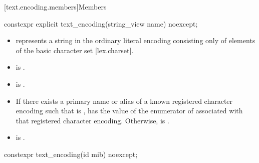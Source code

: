 \documentclass{wg21}
\begin{document}
\begin{addedblock}



[text.encoding.members]{Members}

\begin{itemdecl}
constexpr explicit text_encoding(string_view name) noexcept;
\end{itemdecl}

\begin{itemdescr}
    \preconditions
    \begin{itemize}
        \item {} represents a string in the ordinary literal encoding consisting only of elements of the basic character set [lex.charset].
        \item {} is .
        \item {} is .
    \end{itemize}
    \postconditions
    \begin{itemize}
         \item If there exists a primary name or alias  of a known registered character encoding such that  is ,  has the value of the enumerator of  associated with that registered character encoding. Otherwise,  is .
         \item  {} is .
    \end{itemize}
\end{itemdescr}


\begin{itemdecl}
constexpr text_encoding(id mib) noexcept;
\end{itemdecl}


\end{addedblock}
\end{document}
